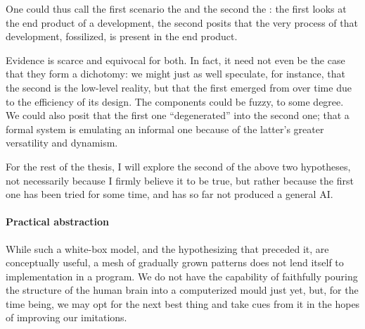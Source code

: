 One could thus call the first scenario the  and the second the : the first looks at the end product of a development, the second posits that the very process of that development, fossilized, is present in the end product.

Evidence is scarce and equivocal for both. In fact, it need not even be the case that they form a dichotomy: we might just as well speculate, for instance, that the second is the low-level reality, but that the first emerged from over time due to the efficiency of its design. The components could be fuzzy, to some degree. We could also posit that the first one ``degenerated'' into the second one; that a formal system is emulating an informal one because of the latter's greater versatility and dynamism.

For the rest of the thesis, I will explore the second of the above two hypotheses, not necessarily because I firmly believe it to be true, but rather because the first one has been tried for some time, and has so far not produced a general AI.

\paragraph{Practical abstraction}

While such a white-box model, and the hypothesizing that preceded it, are conceptually useful, a mesh of gradually grown patterns does not lend itself to implementation in a program. We do not have the capability of faithfully pouring the structure of the human brain into a computerized mould just yet, but, for the time being, we may opt for the next best thing and take cues from it in the hopes of improving our imitations.

